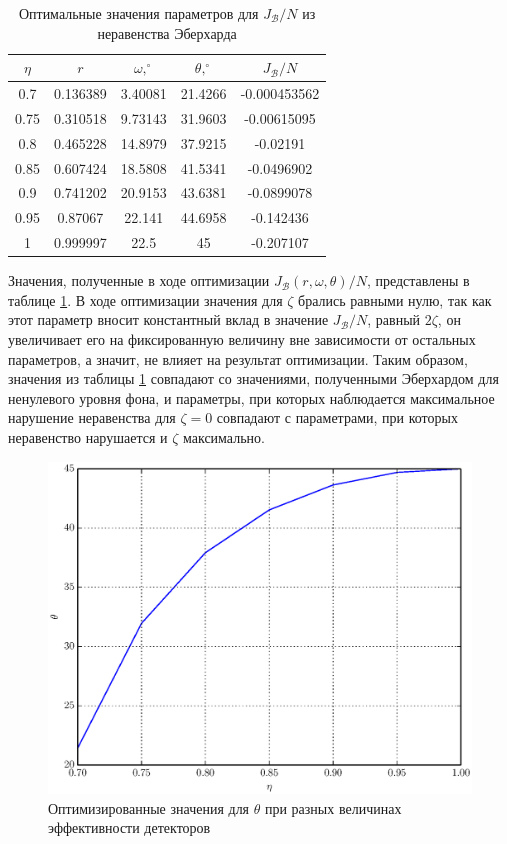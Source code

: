 \documentclass[%
master,         %
subf,           %
href,           %
colorlinks=true %
]{disser}
\numberwithin{equation}{section}
\numberwithin{figure}{section}
\begin{document}
\begin{table}[h]
\centering
\begin{tabular}{|c|c|c|c|c|}
\hline
$\eta$ & $r$ & $\omega,^\circ$ & $\theta,^\circ$ & $J_{\mathcal{B}} / N$
\\\hline
0.7 & 0.136389 & 3.40081 & 21.4266 & -0.000453562\\\hline
0.75 & 0.310518 & 9.73143 & 31.9603 & -0.00615095\\\hline
0.8 & 0.465228 & 14.8979 & 37.9215 & -0.02191\\\hline
0.85 & 0.607424 & 18.5808 & 41.5341 & -0.0496902\\\hline
0.9 & 0.741202 & 20.9153 & 43.6381 & -0.0899078\\\hline
0.95 & 0.87067 & 22.141 & 44.6958 & -0.142436\\\hline
1 & 0.999997 & 22.5 & 45 & -0.207107\\\hline
\end{tabular}
\caption{Оптимальные значения параметров для $J_{\mathcal{B}} / N$ из неравенства Эберхарда}
\label{tab:Eberhard_repeat}
\end{table}

Значения, полученные в ходе оптимизации $J_{\mathcal{B}}(r, \omega, \theta) / N$, представлены в таблице \ref{tab:Eberhard_repeat}. В ходе оптимизации значения для $\zeta$ брались равными нулю, так как этот параметр вносит константный вклад в значение $J_{\mathcal{B}} / N$, равный $2\zeta$, он увеличивает его на фиксированную величину вне зависимости от остальных параметров, а значит, не влияет на результат оптимизации. Таким образом, значения из таблицы \ref{tab:Eberhard_repeat} совпадают со значениями, полученными Эберхардом для ненулевого уровня фона, и параметры, при которых наблюдается максимальное нарушение неравенства для $\zeta = 0$ совпадают с параметрами, при которых неравенство нарушается и $\zeta$ максимально.

\begin{figure}[h]
\includegraphics[scale=0.7]{theta.eps}
\caption{Оптимизированные значения для $\theta$ при разных величинах эффективности детекторов}
\label{fig:theta_opt}
\end{figure}
\end{document}

